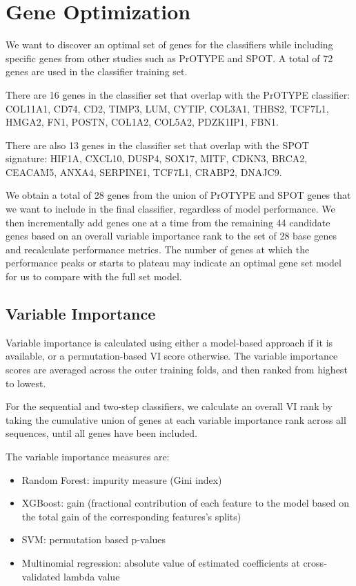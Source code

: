 \documentclass[
]{report}
\begin{document}
\section{Gene Optimization}\label{gene-optimization}

We want to discover an optimal set of genes for the classifiers while including specific genes from other studies such as PrOTYPE and SPOT. A total of 72 genes are used in the classifier training set.

There are 16 genes in the classifier set that overlap with the PrOTYPE classifier: COL11A1, CD74, CD2, TIMP3, LUM, CYTIP, COL3A1, THBS2, TCF7L1, HMGA2, FN1, POSTN, COL1A2, COL5A2, PDZK1IP1, FBN1.

There are also 13 genes in the classifier set that overlap with the SPOT signature: HIF1A, CXCL10, DUSP4, SOX17, MITF, CDKN3, BRCA2, CEACAM5, ANXA4, SERPINE1, TCF7L1, CRABP2, DNAJC9.

We obtain a total of 28 genes from the union of PrOTYPE and SPOT genes that we want to include in the final classifier, regardless of model performance. We then incrementally add genes one at a time from the remaining 44 candidate genes based on an overall variable importance rank to the set of 28 base genes and recalculate performance metrics. The number of genes at which the performance peaks or starts to plateau may indicate an optimal gene set model for us to compare with the full set model.

\subsection{Variable Importance}\label{variable-importance}

Variable importance is calculated using either a model-based approach if it is available, or a permutation-based VI score otherwise. The variable importance scores are averaged across the outer training folds, and then ranked from highest to lowest.

For the sequential and two-step classifiers, we calculate an overall VI rank by taking the cumulative union of genes at each variable importance rank across all sequences, until all genes have been included.

The variable importance measures are:

\begin{itemize}
\item
  Random Forest: impurity measure (Gini index)
\item
  XGBoost: gain (fractional contribution of each feature to the model based on the total gain of the corresponding features's splits)
\item
  SVM: permutation based p-values
\item
  Multinomial regression: absolute value of estimated coefficients at cross-validated lambda value
\end{itemize}
\end{document}
